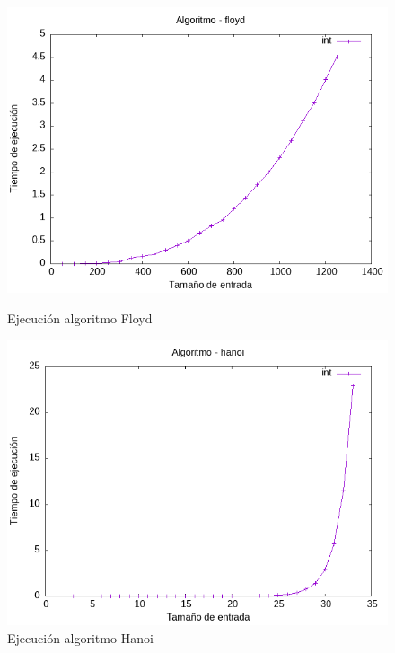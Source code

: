 \documentclass[11pt,openany]{book}
\begin{document}
\begin{figure}[H]
    \begin{minipage}{0.5\textwidth}
        \centering
        \includegraphics[width=\linewidth]{assets/Img/floydint.png}
        \caption{Ejecución algoritmo Floyd}
        \label{fig:floyd}
    \end{minipage}
    \begin{minipage}{0.5\textwidth}
        \centering
        \includegraphics[width=\linewidth]{assets/Img/hanoiint.png}
        \caption{Ejecución algoritmo Hanoi}
        \label{fig:hanoi}
    \end{minipage}
\end{figure}
\end{document}
